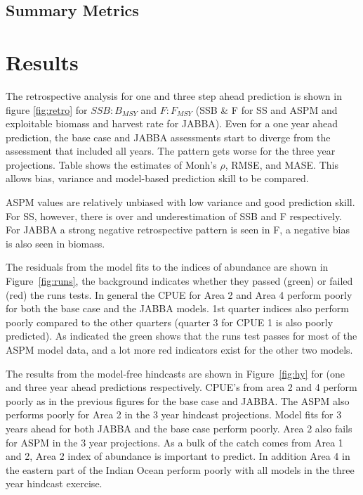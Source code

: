 \documentclass[a4paper]{article}
\begin{document}
\subsection{Summary Metrics}


\section{Results}

The retrospective analysis for one and three step ahead prediction is shown in figure \ref{fig:retro} for $SSB:B_{MSY}$ and $F:F_{MSY}$ (SSB & F for SS and ASPM and exploitable biomass and harvest rate for JABBA). Even for a one year ahead prediction, the base case and JABBA assessments start to diverge from the assessment that included all years. The pattern gets worse for the three year projections. Table  shows the estimates of Monh's $\rho$, RMSE, and MASE. This allows bias, variance and model-based prediction skill to be compared.

ASPM values are relatively unbiased with low variance and good prediction skill. For SS, however, there is over and underestimation of SSB and F respectively. For JABBA a strong negative retrospective pattern is seen in F, a negative bias is also seen in biomass.

The residuals from the model fits to the indices of abundance are shown in Figure~\ref{fig:runs}, the background indicates whether they passed (green) or failed (red) the runs tests. In general the CPUE for Area 2 and Area 4 perform poorly for both the base case and the JABBA models. 1st quarter indices also perform poorly compared to the other quarters (quarter 3 for CPUE 1 is also poorly predicted). As indicated the green shows that the runs test passes for most of the ASPM model data, and a lot more red indicators exist for the other two models.  

The results from the model-free hindcasts are shown in Figure~\ref{fig:hy} for (one and three year ahead predictions respectively. CPUE's from area 2 and 4 perform poorly as in the previous figures for the base case and JABBA. The ASPM also performs poorly for Area 2 in the 3 year hindcast projections. Model fits for 3 years ahead for both JABBA and the base case perform poorly. Area 2 also fails for ASPM in the 3 year projections. As a bulk of the catch comes from Area 1 and 2, Area 2 index of abundance is important to predict. In addition Area 4 in the eastern part of the Indian Ocean perform poorly with all models in the three year hindcast exercise.   
\end{document}
